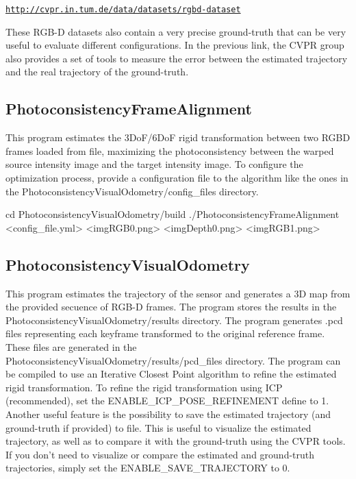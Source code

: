 \href{http://cvpr.in.tum.de/data/datasets/rgbd-dataset}{\tt http://cvpr.in.tum.de/data/datasets/rgbd-\/dataset}

These RGB-\/D datasets also contain a very precise ground-\/truth that can be very useful to evaluate different configurations. In the previous link, the CVPR group also provides a set of tools to measure the error between the estimated trajectory and the real trajectory of the ground-\/truth.\hypertarget{index_PhotoconsistencyFrameAlignment}{}\subsection{PhotoconsistencyFrameAlignment}\label{index_PhotoconsistencyFrameAlignment}
This program estimates the 3DoF/6DoF rigid transformation between two RGBD frames loaded from file, maximizing the photoconsistency between the warped source intensity image and the target intensity image. To configure the optimization process, provide a configuration file to the algorithm like the ones in the PhotoconsistencyVisualOdometry/config\_\-files directory.

\begin{DoxyVerb}
cd PhotoconsistencyVisualOdometry/build
./PhotoconsistencyFrameAlignment <config_file.yml> <imgRGB0.png> <imgDepth0.png> <imgRGB1.png>
\end{DoxyVerb}


 \hypertarget{index_PhotoconsistencyVisualOdometry}{}\subsection{PhotoconsistencyVisualOdometry}\label{index_PhotoconsistencyVisualOdometry}
This program estimates the trajectory of the sensor and generates a 3D map from the provided secuence of RGB-\/D frames. The program stores the results in the PhotoconsistencyVisualOdometry/results directory. The program generates .pcd files representing each keyframe transformed to the original reference frame. These files are generated in the PhotoconsistencyVisualOdometry/results/pcd\_\-files directory. The program can be compiled to use an Iterative Closest Point algorithm to refine the estimated rigid transformation. To refine the rigid transformation using ICP (recommended), set the ENABLE\_\-ICP\_\-POSE\_\-REFINEMENT define to 1. Another useful feature is the possibility to save the estimated trajectory (and ground-\/truth if provided) to file. This is useful to visualize the estimated trajectory, as well as to compare it with the ground-\/truth using the CVPR tools. If you don't need to visualize or compare the estimated and ground-\/truth trajectories, simply set the ENABLE\_\-SAVE\_\-TRAJECTORY to 0.

